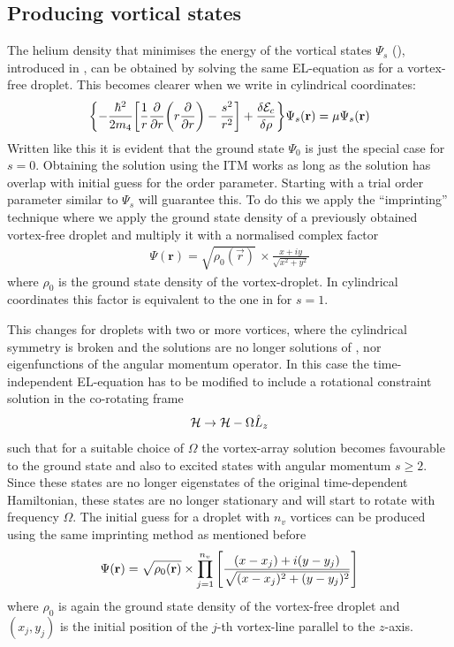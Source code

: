 		\subsection{Producing vortical states}\label{sec:vortical-states}
			The helium density that minimises the energy of the vortical states $\Psi_s$ (), introduced in , can be obtained by solving the same EL-equation as for a vortex-free droplet. This becomes clearer when we write  in cylindrical coordinates:
			\begin{align}
				\qty{-\frac{\hbar^2}{2m_4}\qty[\frac{1}{r}\pdv{r}\qty(r\pdv{r})-\frac{s^2}{r^2}]+\fdv{\mathcal{E}_c}{\rho}}\Psi_s(\vec{r}) = \mu\Psi_s(\vec{r}) \label{eq:el-cyl}
			\end{align}
			Written like this it is evident that the ground state $\Psi_0$ is just the special case for $s=0$. Obtaining the solution using the ITM works as long as the solution has overlap with initial guess for the order parameter. Starting with a trial order parameter similar to $\Psi_s$ will guarantee this. To do this we apply the ``imprinting'' technique where we apply the ground state density of a previously obtained vortex-free droplet and multiply it with a normalised complex factor
			\begin{align}
				\Psi(\mathbf{r}) = \sqrt{\rho_0(\vec{r})} \,\times \frac{x + iy}{\sqrt{x^2 + y^2}} \label{eq28}
			\end{align}
			where $\rho_0$ is the ground state density of the vortex-droplet.  In cylindrical coordinates this factor is equivalent to the one in  for $s=1$. 
			
			This changes for droplets with two or more vortices, where the cylindrical symmetry is broken and the solutions are no longer solutions of , nor eigenfunctions of the angular momentum operator. In this case the time-independent EL-equation has to be modified to include a rotational constraint solution in the co-rotating frame
			\begin{align}
				{\cal H} \rightarrow {\cal H}-\Omega \hat{L}_z
			\end{align}
			 such that for a suitable choice of $\Omega$ the vortex-array solution becomes favourable to the ground state and also to excited states with angular momentum $s\geq 2$. Since these states are no longer eigenstates of the original time-dependent Hamiltonian, these states are no longer stationary and will start to rotate with frequency $\Omega$. The initial guess for a droplet with $n_v$ vortices can be produced using the same imprinting method as mentioned before		
			\begin{align}
				\Psi(\mathbf{r})=\sqrt{\rho_0(\vec{r})} \times \prod _{j=1}^{n_v}\left[ {(x-x_j)+i(y-y_j) \over \sqrt{(x-x_j)^2+(y-y_j)^2}}  \right] \label{eq32}
			\end{align}
			where $\rho_0$ is again the ground state density of the vortex-free droplet and $(x_j,y_j)$ is the initial position of the $j$-th vortex-line parallel to the $z$-axis.

